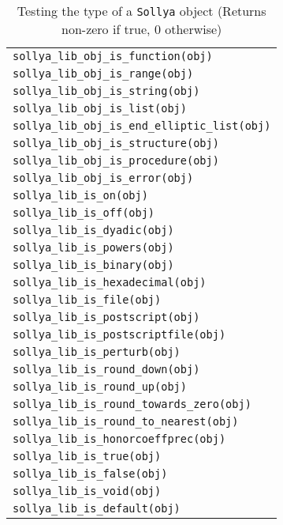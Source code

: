 \documentclass[a4paper]{article}
\newcommand{\sollya}{\texttt{Sollya}\xspace}
\begin{document}
\begin{table}[htp]
  \caption{Testing the type of a \sollya object (Returns non-zero if true, 0 otherwise)}
  \label{type_of_an_object}
  \begin{center}
    \begin{tabular}{|l|}
      \hline
      \verb|sollya_lib_obj_is_function(obj)| \\
      \verb|sollya_lib_obj_is_range(obj)| \\
      \verb|sollya_lib_obj_is_string(obj)| \\
      \verb|sollya_lib_obj_is_list(obj)| \\
      \verb|sollya_lib_obj_is_end_elliptic_list(obj)| \\
      \verb|sollya_lib_obj_is_structure(obj)| \\
      \verb|sollya_lib_obj_is_procedure(obj)| \\
      \verb|sollya_lib_obj_is_error(obj)|\\[0.1cm]
      \hline
      \verb|sollya_lib_is_on(obj)|\phantom{\Large{$A^A$}} \\
      \verb|sollya_lib_is_off(obj)| \\
      \verb|sollya_lib_is_dyadic(obj)| \\
      \verb|sollya_lib_is_powers(obj)| \\
      \verb|sollya_lib_is_binary(obj)| \\
      \verb|sollya_lib_is_hexadecimal(obj)| \\
      \verb|sollya_lib_is_file(obj)| \\
      \verb|sollya_lib_is_postscript(obj)| \\
      \verb|sollya_lib_is_postscriptfile(obj)| \\
      \verb|sollya_lib_is_perturb(obj)| \\
      \verb|sollya_lib_is_round_down(obj)| \\
      \verb|sollya_lib_is_round_up(obj)| \\
      \verb|sollya_lib_is_round_towards_zero(obj)| \\
      \verb|sollya_lib_is_round_to_nearest(obj)| \\
      \verb|sollya_lib_is_honorcoeffprec(obj)| \\
      \verb|sollya_lib_is_true(obj)| \\
      \verb|sollya_lib_is_false(obj)| \\
      \verb|sollya_lib_is_void(obj)| \\
      \verb|sollya_lib_is_default(obj)| \\

\end{tabular}
\end{center}
\end{table}
\end{document}
